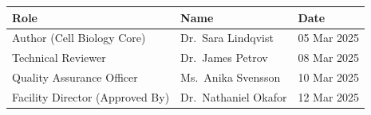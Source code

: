 \begin{tcolorbox}[infobox, title=\faPen\enspace Document Approval Signatures]
\renewcommand{\arraystretch}{1.6}
\begin{tabularx}{\linewidth}{X L{3.5cm} L{2.8cm}}
\toprule
{}
\textbf{Role} & \textbf{Name} & \textbf{Date} \\
\midrule
Author (Cell Biology Core)       & Dr.\ Sara Lindqvist   & 05 Mar 2025 \\
Technical Reviewer                & Dr.\ James Petrov     & 08 Mar 2025 \\
Quality Assurance Officer         & Ms.\ Anika Svensson   & 10 Mar 2025 \\
Facility Director (Approved By)   & Dr.\ Nathaniel Okafor & 12 Mar 2025 \\
\bottomrule
\end{tabularx}
\end{tcolorbox}
